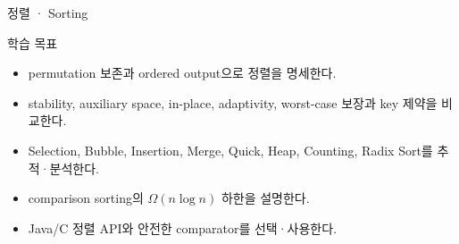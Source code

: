 \begin{frame}[plain]
\vfill
{\color{AlgoBlue}정렬 · Sorting\par}
\vspace{3mm}{\color{AlgoOrange}\rule{32mm}{1.2pt}\par}
\vspace{5mm}{\large 단순 정렬 · Heap · 선형시간 정렬 · Comparator\par}
\vspace{8mm}{\small Algorithm Lecture Notes\par}
\vfill
\end{frame}
\begin{frame}{학습 목표}
\begin{itemize}
  \item permutation 보존과 ordered output으로 정렬을 명세한다.
  \item stability, auxiliary space, in-place, adaptivity, worst-case 보장과 key 제약을 비교한다.
  \item Selection, Bubble, Insertion, Merge, Quick, Heap, Counting, Radix Sort를 추적·분석한다.
  \item comparison sorting의 $\Omega(n\log n)$ 하한을 설명한다.
  \item Java/C 정렬 API와 안전한 comparator를 선택·사용한다.
\end{itemize}
\end{frame}
